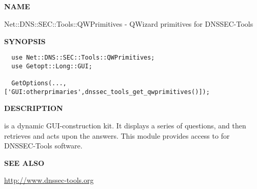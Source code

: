 \clearpage

\subsection{}

{\bf NAME}

Net::DNS::SEC::Tools::QWPrimitives - QWizard primitives for DNSSEC-Tools

{\bf SYNOPSIS}

\begin{verbatim}
  use Net::DNS::SEC::Tools::QWPrimitives;
  use Getopt::Long::GUI;

  GetOptions(...,['GUI:otherprimaries',dnssec_tools_get_qwprimitives()]);
\end{verbatim}

{\bf DESCRIPTION}

 is a dynamic GUI-construction kit.  It displays a series of
questions, and then retrieves and acts upon the answers.  This module
provides access to  for DNSSEC-Tools software.

{\bf SEE ALSO}



\url{http://www.dnssec-tools.org}

